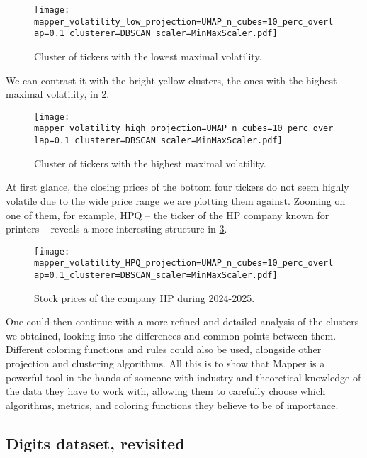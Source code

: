 \begin{figure}[h!]
  \centering
  \texttt{[image: mapper\_volatility\_low\_projection=UMAP\_n\_cubes=10\_perc\_overlap=0.1\_clusterer=DBSCAN\_scaler=MinMaxScaler.pdf]}
  \caption{Cluster of tickers with the lowest maximal volatility.}
  \label{fig:mapper_volatility_low}
\end{figure}

We can contrast it with the bright yellow clusters, the ones with the highest maximal volatility, in \ref{fig:mapper_volatility_high}.

\begin{figure}[h!]
  \centering
  \texttt{[image: mapper\_volatility\_high\_projection=UMAP\_n\_cubes=10\_perc\_overlap=0.1\_clusterer=DBSCAN\_scaler=MinMaxScaler.pdf]}
  \caption{Cluster of tickers with the highest maximal volatility.}
  \label{fig:mapper_volatility_high}
\end{figure}

At first glance, the closing prices of the bottom four tickers do not seem highly volatile due to the wide price range we are plotting them against. Zooming on one of them, for example, HPQ -- the ticker of the HP company known for printers -- reveals a more interesting structure in \ref{fig:mapper_volatility_hpq}.

\begin{figure}[h!]
  \centering
  \texttt{[image: mapper\_volatility\_HPQ\_projection=UMAP\_n\_cubes=10\_perc\_overlap=0.1\_clusterer=DBSCAN\_scaler=MinMaxScaler.pdf]}
  \caption{Stock prices of the company HP during 2024-2025.}
  \label{fig:mapper_volatility_hpq}
\end{figure}

One could then continue with a more refined and detailed analysis of the clusters we obtained, looking into the differences and common points between them. Different coloring functions and rules could also be used, alongside other projection and clustering algorithms. All this is to show that Mapper is a powerful tool in the hands of someone with industry and theoretical knowledge of the data they have to work with, allowing them to carefully choose which algorithms, metrics, and coloring functions they believe to be of importance.

\subsection{Digits dataset, revisited}


